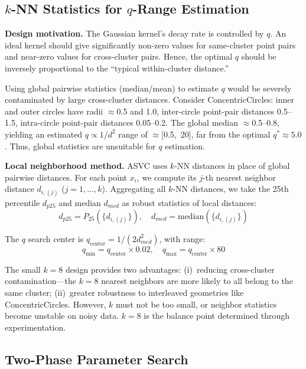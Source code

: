 \subsection{\texorpdfstring{$k$}{k}-NN Statistics for \texorpdfstring{$q$}{q}-Range Estimation}

\textbf{Design motivation.} The Gaussian kernel's decay rate is controlled by $q$. An ideal kernel should give significantly non-zero values for same-cluster point pairs and near-zero values for cross-cluster pairs. Hence, the optimal $q$ should be inversely proportional to the ``typical within-cluster distance.''

Using global pairwise statistics (median/mean) to estimate $q$ would be severely contaminated by large cross-cluster distances. Consider ConcentricCircles: inner and outer circles have radii $\approx$0.5 and 1.0, inter-circle point-pair distances 0.5--1.5, intra-circle point-pair distances 0.05--0.2. The global median $\approx$0.5--0.8, yielding an estimated $q\!\propto\!1/d^2$ range of $\approx$[0.5,~20], far from the optimal $q^*\!\approx\!5.0$. Thus, global statistics are unsuitable for $q$ estimation.

\textbf{Local neighborhood method.} ASVC uses $k$-NN distances in place of global pairwise distances. For each point $x_i$, we compute its $j$-th nearest neighbor distance $d_{i,(j)}$ ($j=1,\dots,k$). Aggregating all $k$-NN distances, we take the 25th percentile $d_{p25}$ and median $d_{med}$ as robust statistics of local distances:
\begin{equation}
d_{p25}=P_{25}(\{d_{i,(j)}\}),\quad d_{med}=\text{median}(\{d_{i,(j)}\})
\end{equation}

The $q$ search center is $q_{\text{center}}=1/(2d_{med}^2)$, with range:
\begin{equation}
q_{\min}=q_{\text{center}}\times0.02,\quad q_{\max}=q_{\text{center}}\times80\label{eq:qrange}
\end{equation}

The small $k\!=\!8$ design provides two advantages: (i)~reducing cross-cluster contamination---the $k\!=\!8$ nearest neighbors are more likely to all belong to the same cluster; (ii)~greater robustness to interleaved geometries like ConcentricCircles. However, $k$ must not be too small, or neighbor statistics become unstable on noisy data. $k\!=\!8$ is the balance point determined through experimentation.

\subsection{Two-Phase Parameter Search}

